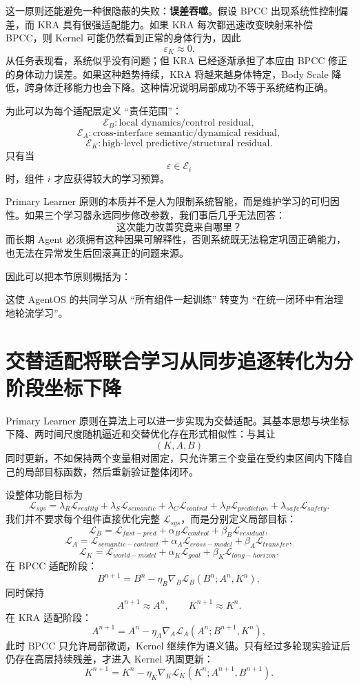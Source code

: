 这一原则还能避免一种很隐蔽的失败：\textbf{误差吞噬}。假设 BPCC 出现系统性控制偏差，而 KRA 具有很强适配能力。如果 KRA 每次都迅速改变映射来补偿 BPCC，则 Kernel 可能仍然看到正常的身体行为，因此
\[
\varepsilon_K\approx 0.
\]
从任务表现看，系统似乎没有问题；但 KRA 已经逐渐承担了本应由 BPCC 修正的身体动力误差。如果这种趋势持续，KRA 将越来越身体特定，Body Scale 降低，跨身体迁移能力也会下降。这种情况说明局部成功不等于系统结构正确。

为此可以为每个适配层定义 ``责任范围''：
\[
\mathcal{E}_B:
\text{local dynamics/control residual},
\]
\[
\mathcal{E}_A:
\text{cross-interface semantic/dynamical residual},
\]
\[
\mathcal{E}_K:
\text{high-level predictive/structural residual}.
\]
只有当
\[
\varepsilon\in\mathcal E_i
\]
时，组件 $i$ 才应获得较大的学习预算。

Primary Learner 原则的本质并不是人为限制系统智能，而是维护学习的可归因性。如果三个学习器永远同步修改参数，我们事后几乎无法回答：
\[
\text{这次能力改善究竟来自哪里？}
\]
而长期 Agent 必须拥有这种因果可解释性，否则系统既无法稳定巩固正确能力，也无法在异常发生后回滚真正的问题来源。

因此可以把本节原则概括为：
\begin{statementbox}
\centering
{}
\end{statementbox}
这使 AgentOS 的共同学习从 ``所有组件一起训练'' 转变为 ``在统一闭环中有治理地轮流学习''。

\section{交替适配将联合学习从同步追逐转化为分阶段坐标下降}

Primary Learner 原则在算法上可以进一步实现为交替适配。其基本思想与块坐标下降、两时间尺度随机逼近和交替优化存在形式相似性：与其让
\[
(K,A,B)
\]
同时更新，不如保持两个变量相对固定，只允许第三个变量在受约束区间内下降自己的局部目标函数，然后重新验证整体闭环。

设整体功能目标为
\[
\mathcal L_{sys}
=
\lambda_R\mathcal L_{reality}
+
\lambda_S\mathcal L_{semantic}
+
\lambda_C\mathcal L_{control}
+
\lambda_P\mathcal L_{prediction}
+
\lambda_{safe}\mathcal L_{safety}.
\]
我们并不要求每个组件直接优化完整 $\mathcal L_{sys}$，而是分别定义局部目标：
\[
\mathcal L_B
=
\mathcal L_{fast-pred}
+
\alpha_B\mathcal L_{control}
+
\beta_B\mathcal L_{residual},
\]
\[
\mathcal L_A
=
\mathcal L_{semantic-contract}
+
\alpha_A\mathcal L_{cross-model}
+
\beta_A\mathcal L_{transfer},
\]
\[
\mathcal L_K
=
\mathcal L_{world-model}
+
\alpha_K\mathcal L_{goal}
+
\beta_K\mathcal L_{long-horizon}.
\]
在 BPCC 适配阶段：
\[
B^{n+1}
=
B^n
-
\eta_B
\nabla_B
\mathcal L_B
(B^n;A^n,K^n),
\]
同时保持
\[
A^{n+1}\approx A^n,
\qquad
K^{n+1}\approx K^n.
\]
在 KRA 适配阶段：
\[
A^{n+1}
=
A^n
-
\eta_A
\nabla_A
\mathcal L_A
(A^n;B^{n+1},K^n),
\]
此时 BPCC 只允许局部微调，Kernel 继续作为语义锚。只有经过多轮现实验证后仍存在高层持续残差，才进入 Kernel 巩固更新：
\[
K^{n+1}
=
K^n
-
\eta_K
\nabla_K
\mathcal L_K
(K^n;A^{n+1},B^{n+1}).
\]

